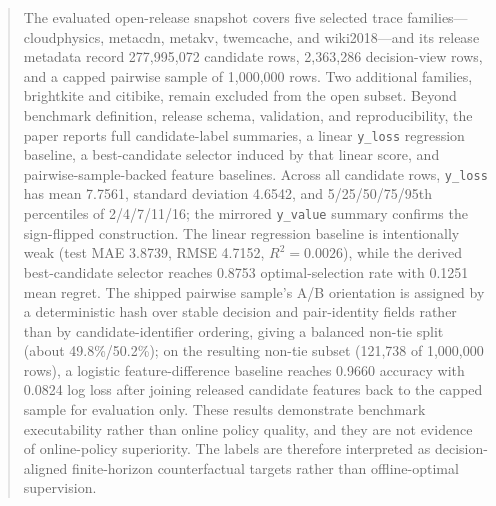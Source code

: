 \documentclass[sigconf,anonymous,nonacm]{acmart}
\begin{document}
\begin{abstract}
\begin{sloppypar}
The evaluated open-release snapshot covers five selected trace families---cloudphysics, metacdn, metakv, twemcache, and wiki2018---and its release metadata record 277,995,072 candidate rows, 2,363,286 decision-view rows, and a capped pairwise sample of 1,000,000 rows. Two additional families, brightkite and citibike, remain excluded from the open subset. Beyond benchmark definition, release schema, validation, and reproducibility, the paper reports full candidate-label summaries, a linear \texttt{y\_loss} regression baseline, a best-candidate selector induced by that linear score, and pairwise-sample-backed feature baselines. Across all candidate rows, \texttt{y\_loss} has mean 7.7561, standard deviation 4.6542, and 5/25/50/75/95th percentiles of 2/4/7/11/16; the mirrored \texttt{y\_value} summary confirms the sign-flipped construction. The linear regression baseline is intentionally weak (test MAE 3.8739, RMSE 4.7152, $R^2=0.0026$), while the derived best-candidate selector reaches 0.8753 optimal-selection rate with 0.1251 mean regret. The shipped pairwise sample's A/B orientation is assigned by a deterministic hash over stable decision and pair-identity fields rather than by candidate-identifier ordering, giving a balanced non-tie split (about 49.8\%/50.2\%); on the resulting non-tie subset (121,738 of 1,000,000 rows), a logistic feature-difference baseline reaches 0.9660 accuracy with 0.0824 log loss after joining released candidate features back to the capped sample for evaluation only. These results demonstrate benchmark executability rather than online policy quality, and they are not evidence of online-policy superiority. The labels are therefore interpreted as decision-aligned finite-horizon counterfactual targets rather than offline-optimal supervision.
\end{sloppypar}
\end{abstract}


\maketitle
















\end{document}
